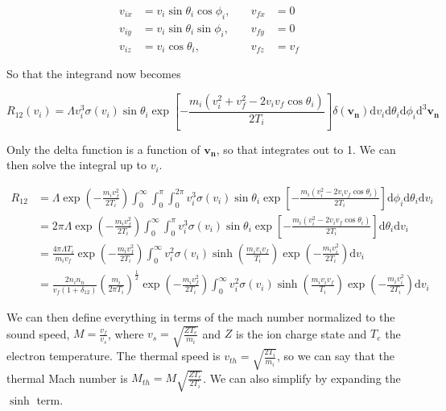 \documentclass[11pt]{article}
\begin{document}
\begin{align*}
	v_{ix} &= v_i \sin \theta_i \cos \phi_i, \quad &v_{fx} &= 0 \\
	v_{iy} &= v_i \sin \theta_i \sin \phi_i, \quad &v_{fy} &= 0 \\
	v_{iz} &= v_i \cos \theta_i, \quad &v_{fz} &= v_f
\end{align*}

So that the integrand now becomes

\begin{equation}
	R_{12} (v_i) = \Lambda v_i^3 \sigma(v_i) \sin \theta_i \exp \left[ -\frac{m_i (v_i^2 + v_f^2 - 2 v_i v_f \cos \theta_i)}{2 T_i} \right] \delta( \mathbf{v_n} ) \mathrm{d} v_i \mathrm{d} \theta_i \mathrm{d} \phi_i  \mathrm{d}^3 \mathbf{v_n}
\end{equation}

Only the delta function is a function of $\mathbf{v_n}$, so that integrates out to 1. We can then solve the integral up to $v_i$.

\begin{align}
	R_{12} &= \Lambda \exp \left( -\frac{m_i v_f^2}{2 T_i} \right)  \int_0^\infty \int_0^{\pi} \int_0^{2 \pi} v_i^3 \sigma(v_i) \sin \theta_i \exp \left[ -\frac{m_i (v_i^2 - 2 v_i v_f \cos \theta_i)}{2 T_i} \right] \mathrm{d} \phi_i \mathrm{d} \theta_i \mathrm{d} v_i \\
	&= 2 \pi \Lambda \exp \left( -\frac{m_i v_f^2}{2 T_i} \right)  \int_0^\infty \int_0^{\pi} v_i^3 \sigma(v_i) \sin \theta_i \exp \left[ - \frac{m_i (v_i^2 - 2 v_i v_f \cos \theta_i)}{2 T_i} \right] \mathrm{d} \theta_i \mathrm{d} v_i \\
	&= \frac{4 \pi \Lambda T_i}{m_i v_f} \exp \left( -\frac{m_i v_f^2}{2 T_i} \right)  \int_0^\infty v_i^2 \sigma(v_i) \sinh \left( \frac{m_i v_i v_f}{T_i} \right) \exp \left( -\frac{m_i v_i^2}{2 T_i} \right) \mathrm{d} v_i \\
	&= \frac{2 n_i n_n}{v_f (1 + \delta_{12})} \left( \frac{m_i}{2 \pi T_i} \right)^{\frac{1}{2}} \exp \left( -\frac{m_i v_f^2}{2 T_i} \right)  \int_0^\infty v_i^2 \sigma(v_i) \sinh \left( \frac{m_i v_i v_f}{T_i} \right) \exp \left( -\frac{m_i v_i^2}{2 T_i} \right) \mathrm{d} v_i
\end{align}

We can then define everything in terms of the mach number normalized to the sound speed, $M = \frac{v_f}{v_s}$, where $v_s = \sqrt{\frac{Z T_e}{m_i}}$ and $Z$ is the ion charge state and $T_e$ the electron temperature. The thermal speed is $v_{th} = \sqrt{\frac{2 T_i}{m_i}}$, so we can say that the thermal Mach number is $M_{th} = M \sqrt{\frac{Z T_e}{2 T_i}}$. We can also simplify by expanding the $\sinh$ term.
\end{document}
